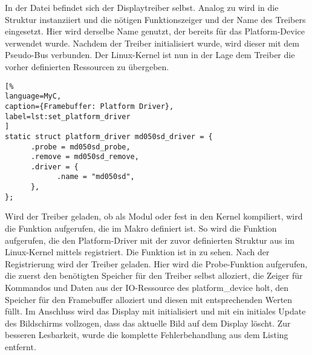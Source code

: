 In der Datei  befindet sich der Displaytreiber selbst. Analog zu  wird in  die Struktur instanziiert und die nötigen Funktionszeiger und der Name des Treibers eingesetzt. Hier wird derselbe Name genutzt, der bereits für das Platform-Device verwendet wurde. Nachdem der Treiber initialisiert wurde, wird dieser mit dem Pseudo-Bus verbunden. Der Linux-Kernel ist nun in der Lage dem Treiber die vorher definierten Ressourcen zu übergeben.

\begin{lstlisting}[%
language=MyC,
caption={Framebuffer: Platform Driver},
label=lst:set_platform_driver
]
static struct platform_driver md050sd_driver = {
      .probe = md050sd_probe,
      .remove = md050sd_remove,
      .driver = {
            .name = "md050sd",
      },
};
\end{lstlisting}

Wird der Treiber geladen, ob als Modul oder fest in den Kernel kompiliert, wird die Funktion aufgerufen, die im Makro  definiert ist. So wird die Funktion  aufgerufen, die den Platform-Driver mit der zuvor definierten Struktur  aus  im Linux-Kernel mittels 
   registriert. Die Funktion  ist in  zu sehen. 
Nach der Registrierung wird der Treiber geladen. Hier wird die Probe-Funktion  aufgerufen, die zuerst den benötigten Speicher für den Treiber selbst alloziert, die Zeiger für Kommandos und Daten aus der IO-Ressource des platform\_device holt, den Speicher für den Framebuffer alloziert und diesen mit entsprechenden Werten füllt. Im Anschluss wird das Display mit  initialisiert und mit  ein initiales Update des Bildschirms vollzogen, dass das aktuelle Bild auf dem Display löscht. Zur besseren Lesbarkeit, wurde die komplette Fehlerbehandlung aus dem Listing entfernt. 


